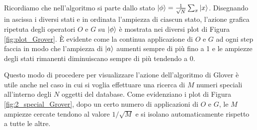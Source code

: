 Ricordiamo che nell'algoritmo si parte dallo stato $\ket{\phi} = \frac{1}{\sqrt{N}} \sum_x \ket{x}$. Disegnando in ascissa i diversi stati e in ordinata l'ampiezza di ciascun stato, l'azione grafica ripetuta degli operatori $O$ e $G$ su $\ket{\phi}$ è mostrata nei diversi plot di Figura \ref{fig:plot_Grover}. È evidente come la continua applicazione di $O$ e $G$ ad ogni step faccia in modo che l'ampiezza di $\ket{a}$ aumenti sempre di più fino a 1 e le ampiezze degli stati rimanenti diminuiscano sempre di più tendendo a 0. 

\noindent Questo modo di procedere per visualizzare l'azione dell'algoritmo di Glover è utile anche nel caso in cui si voglia effettuare una ricerca di $M$ numeri speciali all'interno degli $N$ oggetti del database. Come evidenziano i plot di Figura \ref{fig:2_special_Grover}, dopo un certo numero di applicazioni di $O$ e $G$, le $M$ ampiezze cercate tendono al valore $1/\sqrt{M}$ e si isolano automaticamente rispetto a tutte le altre.

